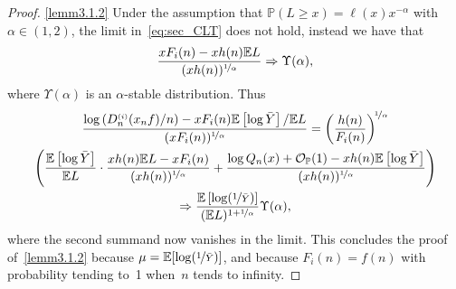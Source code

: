 \documentclass[AHL,Unicode,longabstracts,published]{cedram}
\newcommand{\sss}{\ensuremath{\scriptscriptstyle}}
\newcommand{\Op}{{\mathcal O_{\bbP}}}
\newcommand{\bbP}{\mathbb{P}}
\newcommand{\bbE}{\mathbb{E}}
\begin{document}
\begin{proof}
\eqref{lemm3.1.2} Under the assumption that $\bbP(L\geq x)=\ell(x)x^{-\alpha}$ with $\alpha\in (1, 2)$, the limit in~\eqref{eq:sec_CLT} does not hold, instead we have that
\[
\frac{xF_i(n)-xh(n)\bbE L}{(xh(n))^{\nicefrac1\alpha}}
\Rightarrow \Upsilon(\alpha),
\]
where $\Upsilon(\alpha)$ is an $\alpha$-stable distribution. Thus
\begin{multline*}
\frac{\log \left(D_n^{\sss (i)}(x_nf)/n\right)-xF_i(n)\bbE\left[\log \bar Y\right]/\bbE L}{(xF_i(n))^{\nicefrac1\alpha}}=
\left(\frac{h(n)}{F_i(n)}\right)^{\!\nicefrac1\alpha}\\
\left(\frac{\bbE\left[\log \bar Y\right]}{\bbE L}\cdot \frac{xh(n)\bbE L - xF_i(n)}{(xh(n))^{\nicefrac1\alpha}} + \frac{\log Q_n(x) +\Op(1) - xh(n)\bbE\left[\log\bar Y\right]}{(xh(n))^{\nicefrac1\alpha}}\right)\\
\Rightarrow \frac{\bbE\left[\log(\nicefrac1{\bar Y})\right]}{(\bbE L)^{1+\nicefrac1\alpha}}\Upsilon(\alpha),
\end{multline*}
where the second summand now vanishes in the limit. This concludes the proof of~\eqref{lemm3.1.2} because $\mu = \bbE[\log(\nicefrac1{\bar Y})]$, and because $F_i(n) = f(n)$ with probability tending to~1 when~$n$ tends to infinity.
\end{proof}
\end{document}
